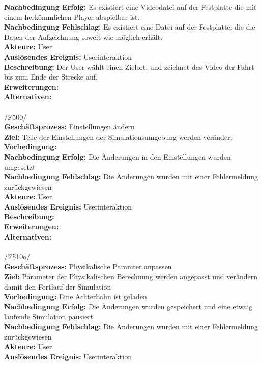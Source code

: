 \textbf{Nachbedingung Erfolg:} Es existiert eine Videodatei auf der Festplatte die mit einem herkömmlichen Player abspielbar ist.\\
\textbf{Nachbedingung Fehlschlag:} Es existiert eine Datei auf der Festplatte, die die Daten der Aufzeichnung soweit wie möglich erhält.\\
\textbf{Akteure:} User\\
\textbf{Auslösendes Ereignis:} Userinteraktion\\
\textbf{Beschreibung:}  Der User wählt einen Zielort, und zeichnet das Video der Fahrt bis zum Ende der Strecke auf.\\
\textbf{Erweiterungen:}\\ 
\textbf{Alternativen:}\\
\\
/F500/\\
\textbf{Geschäftsprozess:} Einstellungen ändern\\
\textbf{Ziel:} Teile der Einstellungen der Simulationsumgebung werden verändert\\
\textbf{Vorbedingung:} \\
\textbf{Nachbedingung Erfolg:} Die Änderungen in den Einstellungen wurden umgesetzt\\
\textbf{Nachbedingung Fehlschlag:}  Die Änderungen wurden mit einer Fehlermeldung zurückgewiesen\\
\textbf{Akteure:} User\\
\textbf{Auslösendes Ereignis:} Userinteraktion\\
\textbf{Beschreibung:} \\
\textbf{Erweiterungen:}\\
\textbf{Alternativen:}\\
\\
/F510o/\\
\textbf{Geschäftsprozess:} Physikalische Paramter anpassen\\
\textbf{Ziel:} Parameter der Physikalischen Berechnung werden angepasst und verändern damit den Fortlauf der Simulation\\
\textbf{Vorbedingung:} Eine Achterbahn ist geladen\\
\textbf{Nachbedingung Erfolg:} Die Änderungen wurden gespeichert und eine etwaig laufende Simulation pausiert\\
\textbf{Nachbedingung Fehlschlag:}  Die Änderungen wurden mit einer Fehlermeldung zurückgewiesen\\
\textbf{Akteure:} User\\
\textbf{Auslösendes Ereignis:} Userinteraktion\\
